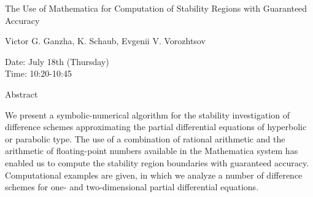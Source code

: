 \begin{center}
\LARGE
The Use of Mathematica for Computation of Stability
              Regions with Guaranteed Accuracy

\end{center}

\begin{center}
\Large
Victor G. Ganzha, K. Schaub, Evgenii V. Vorozhtsov

\end{center}

\noindent
Date:  July 18th (Thursday)\\
Time:  10:20-10:45\\

\begin{center}
\large
Abstract
\end{center}

We present a symbolic-numerical algorithm for the stability investigation of difference schemes
approximating the partial differential equations of hyperbolic or parabolic type. The use of a
combination of rational arithmetic and the arithmetic of floating-point numbers available in the
Mathematica system has enabled us to compute the stability region boundaries with guaranteed
accuracy. Computational examples are given, in which we analyze a number of difference schemes
for one- and two-dimensional partial differential equations. 

